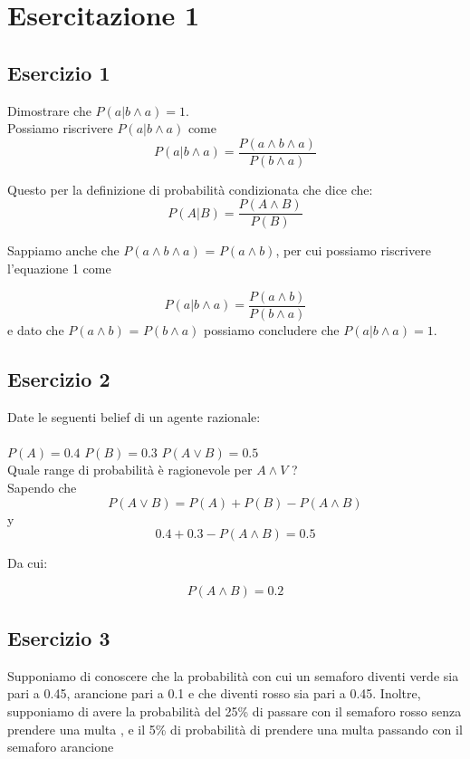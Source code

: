 \documentclass{article}
\begin{document}
	\section{Esercitazione 1}
	\subsection{Esercizio 1}
	
	Dimostrare che \( P(a | b \land	a) = 1  \). \\
	
	Possiamo riscrivere  \( P(a | b \land	a)\) come 
	\begin{equation}
	P(a | b \land	a) = \frac{ P(a \land b \land a)}{P(b \land a)}
	\end{equation}

	Questo per la definizione di probabilità condizionata che dice che:
	\[ P(A | B) = \frac{ P(A \land B )}
					    {P(B)}\]
					    
	Sappiamo anche che \(P(a \land b \land a)\) = \(P(a \land b)\), per cui possiamo riscrivere l'equazione 1 come
	
	\[P(a | b \land	a) = \frac{ P(a \land b)}{P(b \land a)}\] e dato che \(P(a \land b)\) = \(P(b \land a)\) possiamo concludere che \( P(a | b \land	a) = 1  \).
	
	
	\subsection{Esercizio 2}
	Date le seguenti belief di un agente razionale: \\
	\\
	\( P(A) = 0.4 \) \hspace{2cm}   \( P(B) = 0.3 \) \hspace{2cm} 	\( P(A \lor B) = 0.5 \) \\
	
	Quale range di probabilità è ragionevole per  	\( A \land V \) ? \\
	
	Sapendo che 
	\[ P(A \lor B) = P(A) + P(B) - P(A \land B) \] 
	y
	\[0.4 + 0.3 - P(A \land B) = 0.5 \]
	
	Da cui:
	
	\[P(A \land B) = 0.2 \]
	\pagebreak
	\subsection{Esercizio 3}
	Supponiamo di conoscere che la probabilità con cui un
	semaforo diventi verde sia pari a 0.45, arancione pari a
	0.1 e che diventi rosso sia pari a 0.45.
	Inoltre, supponiamo di avere la probabilità del 25\% di
	passare con il semaforo rosso senza prendere una
	multa , e il 5\% di probabilità di prendere una multa
	passando con il semaforo arancione
	
\end{document}
